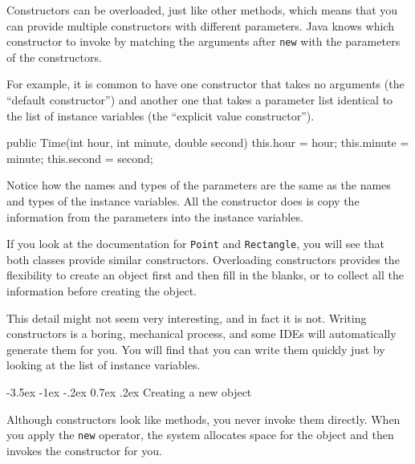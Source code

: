 \documentclass[12pt]{book}
\makeatletter
\theoremstyle{exercise}
\newcommand{\java}[1]{\verb"#1"}
\renewcommand{\section}{\@startsection {section}{1}{\z@}%
    {-3.5ex \@plus -1ex \@minus -.2ex}%
    {0.7ex \@plus.2ex}%
    {\normalfont\Large\bfseries}}
\renewcommand\subsection{\@startsection{subsection}{2}{\z@}%
    {-3.25ex\@plus -1ex \@minus -.2ex}%
    {0.3ex \@plus .2ex}%
    {\normalfont\large\bfseries}}
\newcommand{\java}[1]{\lstinline{#1}} %
\makeatother
\begin{document}


Constructors can be overloaded, just like other methods, which means that you can provide multiple constructors with different parameters.
Java knows which constructor to invoke by matching the arguments after \java{new} with the parameters of the constructors.

For example, it is common to have one constructor that takes no arguments (the ``default constructor'') and another one that takes a parameter list identical to the list of instance variables (the ``explicit value constructor'').

\begin{code}
    public Time(int hour, int minute, double second) {
        this.hour = hour;
        this.minute = minute;
        this.second = second;
    }
\end{code}

Notice how the names and types of the parameters are the same as the names and types of the instance variables.
All the constructor does is copy the information from the parameters into the instance variables.

If you look at the documentation for \java{Point} and \java{Rectangle}, you will see that both classes provide similar constructors.
Overloading constructors provides the flexibility to create an object first and then fill in the blanks, or to collect all the information before creating the object.

This detail might not seem very interesting, and in fact it is not.
Writing constructors is a boring, mechanical process, and some IDEs will automatically generate them for you.
You will find that you can write them quickly just by looking at the list of instance variables.


\section{Creating a new object}


Although constructors look like methods, you never invoke them directly.
When you apply the \java{new} operator, the system allocates space for the object and then invokes the constructor for you.
\end{document}
